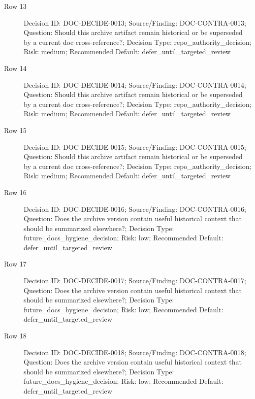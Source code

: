\documentclass[10.5pt,a4paper,openany]{book}
\begin{document}
\begin{description}
\item[Row 13] Decision ID: DOC-\allowbreak{}DECIDE-\allowbreak{}0013; Source/\allowbreak{}Finding: DOC-\allowbreak{}CONTRA-\allowbreak{}0013; Question: Should this archive artifact remain historical or be superseded by a current doc cross-\allowbreak{}reference?; Decision Type: repo\_\allowbreak{}authority\_\allowbreak{}decision; Risk: medium; Recommended Default: defer\_\allowbreak{}until\_\allowbreak{}targeted\_\allowbreak{}review
\item[Row 14] Decision ID: DOC-\allowbreak{}DECIDE-\allowbreak{}0014; Source/\allowbreak{}Finding: DOC-\allowbreak{}CONTRA-\allowbreak{}0014; Question: Should this archive artifact remain historical or be superseded by a current doc cross-\allowbreak{}reference?; Decision Type: repo\_\allowbreak{}authority\_\allowbreak{}decision; Risk: medium; Recommended Default: defer\_\allowbreak{}until\_\allowbreak{}targeted\_\allowbreak{}review
\item[Row 15] Decision ID: DOC-\allowbreak{}DECIDE-\allowbreak{}0015; Source/\allowbreak{}Finding: DOC-\allowbreak{}CONTRA-\allowbreak{}0015; Question: Should this archive artifact remain historical or be superseded by a current doc cross-\allowbreak{}reference?; Decision Type: repo\_\allowbreak{}authority\_\allowbreak{}decision; Risk: medium; Recommended Default: defer\_\allowbreak{}until\_\allowbreak{}targeted\_\allowbreak{}review
\item[Row 16] Decision ID: DOC-\allowbreak{}DECIDE-\allowbreak{}0016; Source/\allowbreak{}Finding: DOC-\allowbreak{}CONTRA-\allowbreak{}0016; Question: Does the archive version contain useful historical context that should be summarized elsewhere?; Decision Type: future\_\allowbreak{}docs\_\allowbreak{}hygiene\_\allowbreak{}decision; Risk: low; Recommended Default: defer\_\allowbreak{}until\_\allowbreak{}targeted\_\allowbreak{}review
\item[Row 17] Decision ID: DOC-\allowbreak{}DECIDE-\allowbreak{}0017; Source/\allowbreak{}Finding: DOC-\allowbreak{}CONTRA-\allowbreak{}0017; Question: Does the archive version contain useful historical context that should be summarized elsewhere?; Decision Type: future\_\allowbreak{}docs\_\allowbreak{}hygiene\_\allowbreak{}decision; Risk: low; Recommended Default: defer\_\allowbreak{}until\_\allowbreak{}targeted\_\allowbreak{}review
\item[Row 18] Decision ID: DOC-\allowbreak{}DECIDE-\allowbreak{}0018; Source/\allowbreak{}Finding: DOC-\allowbreak{}CONTRA-\allowbreak{}0018; Question: Does the archive version contain useful historical context that should be summarized elsewhere?; Decision Type: future\_\allowbreak{}docs\_\allowbreak{}hygiene\_\allowbreak{}decision; Risk: low; Recommended Default: defer\_\allowbreak{}until\_\allowbreak{}targeted\_\allowbreak{}review

\end{description}
\end{document}
